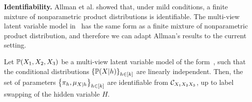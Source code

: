 \documentclass{article}
\begin{document}

{\bf Identifiability.} Allman et al. showed that, under mild conditions, a finite mixture of nonparametric product distributions is identifiable. The multi-view latent variable model in~ has the same form as a finite mixture of nonparametric product distribution, and therefore we can adapt Allman's results to the current setting.
\begin{theorem}
  Let $\mathbb{P}(X_1,X_2,X_3)$ be a multi-view latent variable model of the form~, such that the conditional distributions $\left\{\mathbb{P}(X|h)\right\}_{h \in [k]}$ are linearly independent. Then, the set of parameters $\left\{\pi_h, \mu_{X|h}\right\}_{h \in [k]}$ are identifiable from $\mathcal{C}_{X_1 X_2 X_3}$, up to label swapping of the hidden variable $H$.
\end{theorem}
\end{document}
